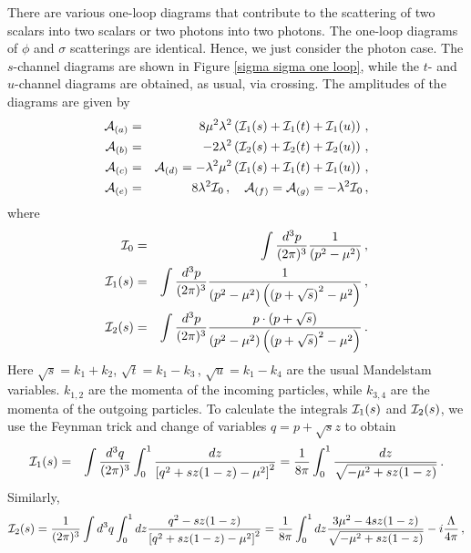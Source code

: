 \documentclass[11pt]{article}
\begin{document}
There are various one-loop diagrams that contribute to the scattering of two scalars into two scalars or two photons into two photons. The one-loop diagrams of $\phi$ and $\sigma$ scatterings are identical. Hence, we just consider the photon case. The $s$-channel  diagrams are shown in Figure \ref{sigma sigma one loop}, while the $t$- and $u$-channel diagrams are obtained, as usual, via crossing. The amplitudes of the diagrams are given by
%
\begin{eqnarray}
\nonumber
{\cal A}_{(a)}&=&8\mu^2\lambda^2\left({\cal I}_1(s)+{\cal I}_1(t)+{\cal I}_1(u)\right)\,,\\
\nonumber
{\cal A}_{(b)}&=&-2\lambda^2\left({\cal I}_2(s)+{\cal I}_2(t)+{\cal I}_2(u)\right)\,,\\
\nonumber
{\cal A}_{(c)}&=&{\cal A}_{(d)}=-\lambda^2\mu^2\left({\cal I}_1(s)+{\cal I}_1(t)+{\cal I}_1(u)\right)\,,\\
{\cal A}_{(e)}&=&8\lambda^2 {\cal I}_0\,,\quad {\cal A}_{(f)}={\cal A}_{(g)}=-\lambda^2 {\cal I}_0\,,
\label{divergent integral in phi phi scattering}
\end{eqnarray}
%
where
%
\begin{eqnarray}
\nonumber
{\cal I}_0&=&\int \frac{d^3 p}{(2\pi)^3}\frac{1}{\left(p^2-\mu^2\right)}\,,\\
\nonumber
{\cal I}_1(s)&=&\int \frac{d^3 p}{(2\pi)^3}\frac{1}{\left(p^2-\mu^2\right)\left(\left(p+\sqrt s\right)^2-\mu^2\right)}\,,\\
{\cal I}_2(s)&=&\int \frac{d^3 p}{(2\pi)^3}\frac{p\cdot(p+\sqrt s)}{\left(p^2-\mu^2\right)\left(\left(p+\sqrt s\right)^2-\mu^2\right)}\,.
\end{eqnarray}
%
Here $\sqrt s=k_1+k_2$, $\sqrt t=k_1-k_3$\,, $\sqrt u=k_1-k_4$ are the usual Mandelstam variables. $k_{1,2}$ are the momenta of the incoming particles, while $k_{3,4}$ are the momenta of the outgoing particles. 
To calculate the integrals ${\cal I}_1(s)$ and ${\cal I}_2(s)$, we use the Feynman trick and change of variables $q=p+\sqrt s z$ to obtain
%
\begin{eqnarray}
{\cal I}_1(s)&=&\int \frac{d^3q}{(2\pi)^3}\int_0^1 \frac{dz}{\left[q^2+sz(1-z)-\mu^2\right]^2} = \frac{1}{8\pi}\int_0^1 \frac{dz}{\sqrt{-\mu^2+sz(1-z)}}\,.
\label{first I}
\end{eqnarray}
%
Similarly,
%
\begin{eqnarray}
\nonumber
{\cal I}_2(s)=\frac{1}{(2\pi)^3}\int d^3 q\int_0^1 dz\frac{q^2-sz(1-z)}{\left[q^2+sz(1-z)-\mu^2\right]^2} 
= \frac{1}{8\pi}\int_0^1 dz \frac{3\mu^2-4sz(1-z)}{\sqrt{-\mu^2+sz(1-z)}}-i\frac{\Lambda}{4\pi}\,,\\
\label{second I}
\end{eqnarray}
\end{document}
